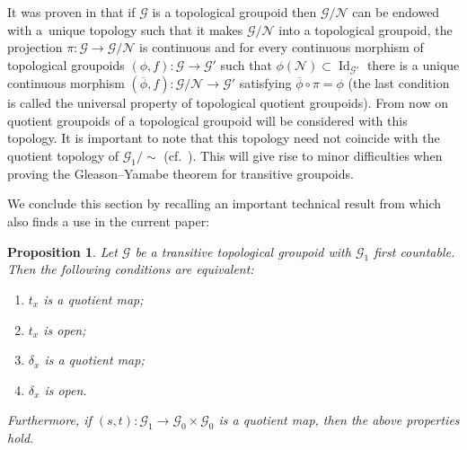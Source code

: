 \documentclass[pdftex]{sigma}
\newtheorem{prop}[tw]{Proposition}
\begin{document}
It was proven in \cite{BH} that if $\mathcal{G}$ is a topological groupoid then $\mathcal{G}\slash\mathcal{N}$ can be endowed with a~unique topology such that it makes $\mathcal{G}\slash\mathcal{N}$ into a topological groupoid, the projection $\pi\colon \mathcal{G}\rightarrow\mathcal{G}\slash\mathcal{N}$ is continuous and for every continuous morphism of topological groupoids $(\phi,f)\colon \mathcal{G}\rightarrow\mathcal{G'}$ such that $\phi (\mathcal{N})\subset \operatorname{Id}_{\mathcal{G}'}$ there is a unique continuous morphism $(\overline{\phi},f)\colon \mathcal{G}\slash\mathcal{N}\rightarrow\mathcal{G}'$ satisfying $\overline{\phi}\circ\pi=\phi$ (the last condition is called the universal property of topological quotient groupoids). From now on quotient groupoids of a topological groupoid will be considered with this topology. It is important to note that this topology need not coincide with the quotient topology of $\mathcal{G}_1\slash\sim$ (cf.~\cite{McK1}). This will give rise to minor difficulties when proving the Gleason--Yamabe theorem for transitive groupoids.

We conclude this section by recalling an important technical result from \cite{H5oids} which also finds a use in the current paper:
\begin{prop}\label{eq} Let $\mathcal{G}$ be a transitive topological groupoid with $\mathcal{G}_1$ first countable. Then the following conditions are equivalent:
\begin{enumerate}\itemsep=0pt
\item[$1)$] $t_x$ is a quotient map;
\item[$2)$] $t_x$ is open;
\item[$3)$] $\delta_x$ is a quotient map;
\item[$4)$] $\delta_x$ is open.
\end{enumerate}
Furthermore, if $(s,t)\colon \mathcal{G}_1\rightarrow \mathcal{G}_0\times\mathcal{G}_0$ is a quotient map, then the above properties hold.
\end{prop}
\end{document}

